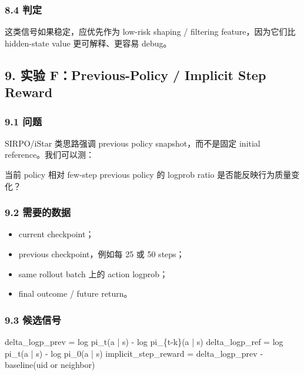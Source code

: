 \documentclass[
  10pt,
]{ctexart}
\newenvironment{Shaded}{}{}
\newcommand{\NormalTok}[1]{#1}
\providecommand{\tightlist}{%
  \setlength{\itemsep}{0pt}\setlength{\parskip}{0pt}}
\begin{document}
\subsubsection{8.4 判定}\label{ux5224ux5b9a-4}

这类信号如果稳定，应优先作为 low-risk shaping / filtering
feature，因为它们比 hidden-state value 更可解释、更容易 debug。

\subsection{9. 实验 F：Previous-Policy / Implicit Step
Reward}\label{ux5b9eux9a8c-fprevious-policy-implicit-step-reward}

\subsubsection{9.1 问题}\label{ux95eeux9898-6}

SIRPO/iStar 类思路强调 previous policy snapshot，而不是固定 initial
reference。我们可以测：

当前 policy 相对 few-step previous policy 的 logprob ratio
是否能反映行为质量变化？

\subsubsection{9.2 需要的数据}\label{ux9700ux8981ux7684ux6570ux636e}

\begin{itemize}
\tightlist
\item
  current checkpoint；
\item
  previous checkpoint，例如每 25 或 50 steps；
\item
  same rollout batch 上的 action logprob；
\item
  final outcome / future return。
\end{itemize}

\subsubsection{9.3 候选信号}\label{ux5019ux9009ux4fe1ux53f7}

\begin{Shaded}
\begin{Highlighting}[]
\NormalTok{delta\_logp\_prev = log pi\_t(a | s) {-} log pi\_\{t{-}k\}(a | s)}
\NormalTok{delta\_logp\_ref = log pi\_t(a | s) {-} log pi\_0(a | s)}
\NormalTok{implicit\_step\_reward = delta\_logp\_prev {-} baseline(uid or neighbor)}
\end{Highlighting}
\end{Shaded}
\end{document}
